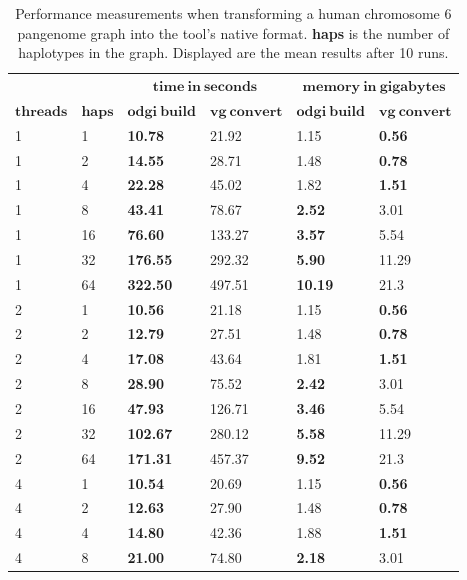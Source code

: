 \begin{table}[!ht]
	\centering
	\caption{\label{tab:build} Performance measurements when transforming a human chromosome 6 pangenome graph into the tool's native format. \textbf{haps} is the number of haplotypes in the graph. Displayed are the mean results after 10 runs.}
	\begin{tabular}{@{}llllll@{}}
		& & \multicolumn{2}{c}{$\mathbf{time\ in\ seconds}$} & \multicolumn{2}{c}{$\mathbf{memory\ in\ gigabytes}$} \\ \cmidrule(lr){3-4} \cmidrule(lr){5-6}
		{$\mathbf{threads}$} & $\mathbf{haps}$ &{$\mathbf{odgi\ build}$} & {$\mathbf{vg\ convert}$} & {$\mathbf{odgi\ build}$} & $\mathbf{vg\ convert}$ \\ \hline
		1 & 1 & \textbf{10.78} & 21.92 & 1.15 & \textbf{0.56} \\
		1 & 2 & \textbf{14.55} & 28.71 & 1.48 & \textbf{0.78} \\ 
		1 & 4 & \textbf{22.28} & 45.02 & 1.82 & \textbf{1.51} \\ 
		1 & 8 & \textbf{43.41} & 78.67 & \textbf{2.52} & 3.01 \\ 
		1 & 16 & \textbf{76.60} & 133.27 & \textbf{3.57} & 5.54 \\ 
		1 & 32 & \textbf{176.55} & 292.32 & \textbf{5.90} & 11.29 \\ 
		1 & 64 & \textbf{322.50} & 497.51 & \textbf{10.19} & 21.3 \\ \midrule
		2 & 1 & \textbf{10.56} & 21.18 & 1.15 & \textbf{0.56} \\ 
		2 & 2 & \textbf{12.79} & 27.51 & 1.48 & \textbf{0.78} \\ 
		2 & 4 & \textbf{17.08} & 43.64 & 1.81 & \textbf{1.51} \\ 
		2 & 8 & \textbf{28.90} & 75.52 & \textbf{2.42} & 3.01 \\ 
		2 & 16 & \textbf{47.93} & 126.71 & \textbf{3.46} & 5.54 \\ 
		2 & 32 & \textbf{102.67} & 280.12 & \textbf{5.58} & 11.29 \\ 
		2 & 64 & \textbf{171.31} & 457.37 & \textbf{9.52} & 21.3 \\ \midrule
		4 & 1 & \textbf{10.54} & 20.69 & 1.15 & \textbf{0.56} \\ 
		4 & 2 & \textbf{12.63} & 27.90 & 1.48 & \textbf{0.78} \\ 
		4 & 4 & \textbf{14.80} & 42.36 & 1.88 & \textbf{1.51} \\ 
		4 & 8 & \textbf{21.00} & 74.80 & \textbf{2.18} & 3.01 \\ 

\end{tabular}
\end{table}
